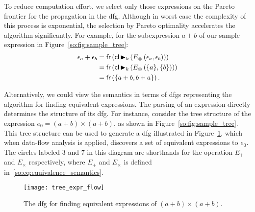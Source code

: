 To reduce computation effort, we select only those expressions on the Pareto
frontier for the propagation in the \gls{dfg}\@. Although in worst case the
complexity of this process is exponential, the selection by Pareto optimality
accelerates the algorithm significantly. For example, for the subexpression $a
+ b$ of our sample expression in Figure~\ref{so:fig:sample_tree}:
\begin{equation}
    \begin{aligned}
        \epsilon_a + \epsilon_b
            &= \operatorname{\mathsf{fr}}\left(
                    \operatorname{\mathsf{cl}} \operatorname{\blacktriangleright}_k \left(
                        E_\otimes \left( \epsilon_a, \epsilon_b \right)
                    \right)
                \right) \\
            &= \operatorname{\mathsf{fr}}\left(
                    \operatorname{\mathsf{cl}} \operatorname{\blacktriangleright}_k \left(
                        E_\otimes \left( \{a\}, \{b\} \right)
                    \right)
                \right) \\
            &= \operatorname{\mathsf{fr}}\left(
                    \{ a + b, b + a \}
                \right).
    \end{aligned}
\end{equation}

Alternatively, we could view the semantics in terms of \glspl{dfg} representing
the algorithm for finding equivalent expressions. The parsing of an expression
directly determines the structure of its \gls{dfg}\@. For instance, consider
the tree structure of the expression $e_0 = (a + b) \times (a + b)$, as shown
in Figure~\ref{so:fig:sample_tree}. This tree structure can be used to generate
a \gls{dfg} illustrated in Figure~\ref{so:fig:tree_expr_flow}, which when
data-flow analysis is applied, discovers a set of equivalent expressions to
$e_0$. The circles labeled $3$ and $7$ in this diagram are shorthands for the
operation $E_+$ and $E_\times$ respectively, where $E_+$ and $E_\times$ is
defined in~\eqref{so:eq:equivalence_semantics}.
\begin{figure}[ht]
    \centering
    \texttt{[image: tree\_expr\_flow]}
    \caption{The \gls{dfg} for finding equivalent expressions of
    $(a + b) \times (a + b)$.}\label{so:fig:tree_expr_flow}
\end{figure}

